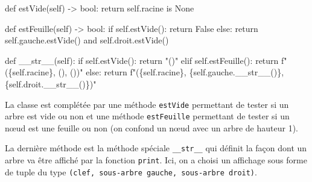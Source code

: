 \documentclass[
  a4paper,
  DIV=11,
  numbers=noendperiod]{scrartcl}
\newenvironment{Shaded}{\begin{snugshade}}{\end{snugshade}}
\newcommand{\BuiltInTok}[1]{\textcolor[rgb]{0.00,0.23,0.31}{#1}}
\newcommand{\ControlFlowTok}[1]{\textcolor[rgb]{0.00,0.23,0.31}{#1}}
\newcommand{\FunctionTok}[1]{\textcolor[rgb]{0.28,0.35,0.67}{#1}}
\newcommand{\KeywordTok}[1]{\textcolor[rgb]{0.00,0.23,0.31}{#1}}
\newcommand{\NormalTok}[1]{\textcolor[rgb]{0.00,0.23,0.31}{#1}}
\newcommand{\OperatorTok}[1]{\textcolor[rgb]{0.37,0.37,0.37}{#1}}
\newcommand{\SpecialCharTok}[1]{\textcolor[rgb]{0.37,0.37,0.37}{#1}}
\newcommand{\SpecialStringTok}[1]{\textcolor[rgb]{0.13,0.47,0.30}{#1}}
\newcommand{\StringTok}[1]{\textcolor[rgb]{0.13,0.47,0.30}{#1}}
\newcommand{\VariableTok}[1]{\textcolor[rgb]{0.07,0.07,0.07}{#1}}
\begin{document}
\begin{Shaded}
\begin{Highlighting}[]
    \KeywordTok{def}\NormalTok{ estVide(}\VariableTok{self}\NormalTok{) }\OperatorTok{{-}\textgreater{}} \BuiltInTok{bool}\NormalTok{:}
        \ControlFlowTok{return} \VariableTok{self}\NormalTok{.racine }\KeywordTok{is} \VariableTok{None}

    \KeywordTok{def}\NormalTok{ estFeuille(}\VariableTok{self}\NormalTok{) }\OperatorTok{{-}\textgreater{}} \BuiltInTok{bool}\NormalTok{:}
        \ControlFlowTok{if} \VariableTok{self}\NormalTok{.estVide():}
            \ControlFlowTok{return} \VariableTok{False}
        \ControlFlowTok{else}\NormalTok{:}
            \ControlFlowTok{return} \VariableTok{self}\NormalTok{.gauche.estVide() }\KeywordTok{and} \VariableTok{self}\NormalTok{.droit.estVide()}

    \KeywordTok{def} \FunctionTok{\_\_str\_\_}\NormalTok{(}\VariableTok{self}\NormalTok{):}
        \ControlFlowTok{if} \VariableTok{self}\NormalTok{.estVide():}
            \ControlFlowTok{return} \StringTok{"()"}
        \ControlFlowTok{elif} \VariableTok{self}\NormalTok{.estFeuille():}
            \ControlFlowTok{return} \SpecialStringTok{f"(\textquotesingle{}}\SpecialCharTok{\{}\VariableTok{self}\SpecialCharTok{.}\NormalTok{racine}\SpecialCharTok{\}}\SpecialStringTok{\textquotesingle{}, (), ())"}
        \ControlFlowTok{else}\NormalTok{:}
            \ControlFlowTok{return} \SpecialStringTok{f"(\textquotesingle{}}\SpecialCharTok{\{}\VariableTok{self}\SpecialCharTok{.}\NormalTok{racine}\SpecialCharTok{\}}\SpecialStringTok{\textquotesingle{}, }\SpecialCharTok{\{}\VariableTok{self}\SpecialCharTok{.}\NormalTok{gauche}\SpecialCharTok{.}\FunctionTok{\_\_str\_\_}\NormalTok{()}\SpecialCharTok{\}}\SpecialStringTok{, }\SpecialCharTok{\{}\VariableTok{self}\SpecialCharTok{.}\NormalTok{droit}\SpecialCharTok{.}\FunctionTok{\_\_str\_\_}\NormalTok{()}\SpecialCharTok{\}}\SpecialStringTok{)"}
\end{Highlighting}
\end{Shaded}

La classe est complétée par une méthode \texttt{estVide} permettant de
tester si un arbre est vide ou non et une méthode \texttt{estFeuille}
permettant de tester si un nœud est une feuille ou non (on confond un
nœud avec un arbre de hauteur 1).

La dernière méthode est la méthode spéciale \texttt{\_\_str\_\_} qui
définit la façon dont un arbre va être affiché par la fonction
\texttt{print}. Ici, on a choisi un affichage sous forme de tuple du
type \texttt{(clef,\ sous-arbre\ gauche,\ sous-arbre\ droit)}.
\end{document}
